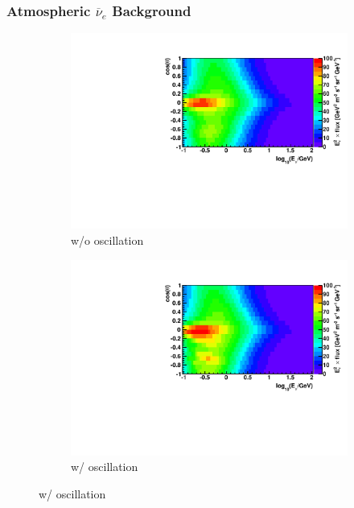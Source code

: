 \documentclass{beamer}
\begin{document}
\begin{frame}
	\frametitle{Atmospheric $\overline{\nu}_{e}$ Background}
	\begin{figure}
		\centering
		\begin{subfigure}[b]{0.49\linewidth}
			\caption{ w/o oscillation }
			\includegraphics[width=\linewidth]{atm_nuebar_hist.pdf}
		\end{subfigure}
		\begin{subfigure}[b]{0.49\linewidth}
			\caption{ w/ oscillation }
			\includegraphics[width=\linewidth]{atm_nuebar_osc_hist.pdf}
		\end{subfigure}
	\end{figure}
\end{frame}
\end{document}
